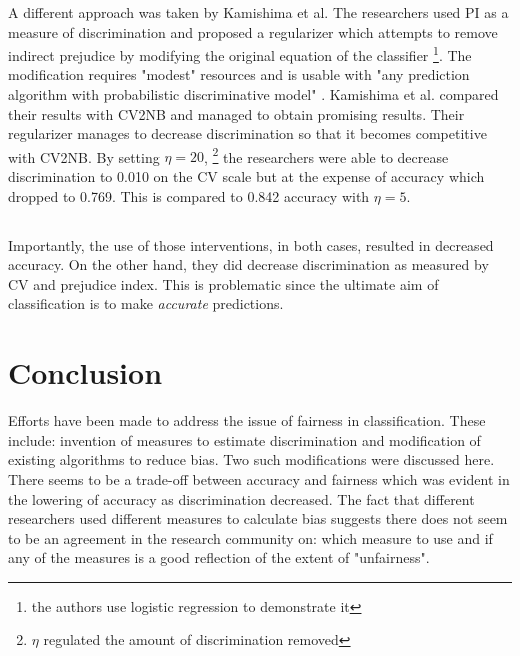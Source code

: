 \documentclass[a4paper, 12pt, notitlepage]{article}
\begin{document}
A different approach was taken by Kamishima et al. The researchers used PI as a measure of discrimination and proposed a regularizer which attempts to remove indirect prejudice by modifying the original equation of the classifier \footnote{the authors use logistic regression to demonstrate it}. The modification requires "modest" resources and is usable with "any prediction algorithm with probabilistic discriminative model" \cite[p.~35]{kamishima2012b}. Kamishima et al. compared their results with CV2NB and managed to obtain promising results. Their regularizer manages to decrease discrimination so that it becomes competitive with CV2NB. By setting $\eta = 20$, \footnote{$\eta$ regulated the amount of discrimination removed} the researchers  were able to decrease discrimination to 0.010 on the CV scale but at the expense of accuracy which dropped to 0.769. This is compared to 0.842 accuracy with $\eta = 5$.

\subsection*{}

\vspace{-0.75cm}

Importantly, the use of those interventions, in both cases, resulted in decreased accuracy. On the other hand, they did decrease discrimination as measured by CV and prejudice index. \cite[p.~44]{kamishima2012b} \cite{calders2010} This is problematic since the ultimate aim of classification is to make \emph{accurate} predictions.

\vspace{0.2cm}

\section*{Conclusion}

Efforts have been made to address the issue of fairness in classification. These include: invention of measures to estimate discrimination and modification of existing algorithms to reduce bias. Two such modifications were discussed here. There seems to be a trade-off between accuracy and fairness which was evident in the lowering of accuracy as discrimination decreased. The fact that different researchers used different measures to calculate bias suggests there does not seem to be an agreement in the research community on: which measure to use and if any of the measures is a good reflection of the extent of "unfairness". 
\end{document}
